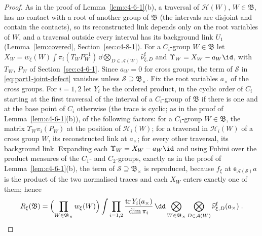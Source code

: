 \begin{proof}
As in the proof of Lemma~\ref{lem:c4-6-1}(b), a traversal of $\mathcal H(W)$, $W\in\mathfrak B$, has no contact with a root of another group of $\mathfrak B$ (the intervals are disjoint and contain the contacts), so its reconstructed link depends only on the root variables of $W$, and a traversal outside every interval has its background link $U_1$ (Lemma~\ref{lem:covered}, Section~\ref{sec:c4-8-1}). For a $C_i$-group $W\in\mathfrak B$ let $X_W=w_\xi(W)\int\pi_i(T_WP_W^{-1})\,\dd\bigotimes_{D\in\mathcal A(W)}\widehat\nu^{\mathrm f}_{\xi,D}$ and $\Upsilon_W=X_W-a_W\id$, with $T_W$, $P_W$ of Section~\ref{sec:c4-6-1}. Since $a_W=0$ for cross groups, the term of $\mathcal S$ in \eqref{eq:part1-joint-defect} vanishes unless $\mathcal S\supseteq\mathfrak B_\times$. Fix the root variables $a_\times$ of the cross groups. For $i=1,2$ let $Y_i$ be the ordered product, in the cyclic order of $C_i$ starting at the first traversal of the interval of a $C_i$-group of $\mathfrak B$ if there is one and at the base point of $C_i$ otherwise (the trace is cyclic; as in the proof of Lemma~\ref{lem:c4-6-1}(b)), of the following factors: for a $C_i$-group $W\in\mathfrak B$, the matrix $\Upsilon_W\pi_i(P_W)$ at the position of $\mathcal H_i(W)$; for a traversal in $\mathcal H_i(W)$ of a cross group $W$, its reconstructed link at $a_\times$; for every other traversal, its background link. Expanding each $\Upsilon_W=X_W-a_W\id$ and using Fubini over the product measures of the $C_1$- and $C_2$-groups, exactly as in the proof of Lemma~\ref{lem:c4-6-1}(b), the term of $\mathcal S\supseteq\mathfrak B_\times$ is reproduced, because $f_\xi$ at $\mathsf e_{\mathcal A(\mathcal S)}a$ is the product of the two normalised traces and each $X_W$ enters exactly one of them; hence
\begin{equation*}
    R_\xi(\mathfrak B)=\Bigl(\prod_{W\in\mathfrak B_\times}w_\xi(W)\Bigr)\int\prod_{i=1,2}\frac{\operatorname{tr}Y_i(a_\times)}{\dim\pi_i}\,\dd\bigotimes_{W\in\mathfrak B_\times}\bigotimes_{D\in\mathcal A(W)}\widehat\nu^{\mathrm f}_{\xi,D}(a_\times)\;.
\end{equation*}

\end{proof}
